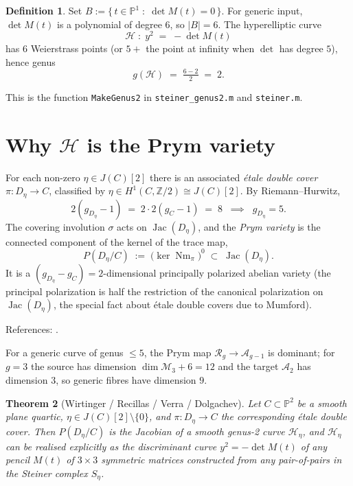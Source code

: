 \documentclass[11pt]{amsart}
\theoremstyle{plain}
\newtheorem{theorem}{Theorem}[section]
\theoremstyle{definition}
\newtheorem{definition}[theorem]{Definition}
\theoremstyle{remark}
\newcommand{\Jac}{\operatorname{Jac}}
\newcommand{\Nm}{\operatorname{Nm}}
\newcommand{\Pp}{\mathbb P}
\newcommand{\Z}{\mathbb Z}
\newcommand{\Hh}{\mathcal H}
\newcommand{\Mm}{\mathcal M}
\newcommand{\Aa}{\mathcal A}
\newcommand{\Rr}{\mathcal R}
\begin{document}
\begin{definition}
Set $B := \bigl\{\, t \in \Pp^1 \;:\; \det M(t) = 0 \,\bigr\}$. For generic
input, $\det M(t)$ is a polynomial of degree $6$, so $|B| = 6$. The
hyperelliptic curve
\[
  \Hh \;:\; y^2 \;=\; -\det M(t)
\]
has $6$ Weierstrass points (or $5 +$ the point at infinity when $\det$ has
degree $5$), hence genus
\[
  g(\Hh) \;=\; \tfrac{6 - 2}{2} \;=\; 2.
\]
\end{definition}

This is the function \texttt{MakeGenus2} in \texttt{steiner\_genus2.m} and
\texttt{steiner.m}.

\section{Why $\Hh$ is the Prym variety}
\label{sec:prym}

For each non-zero $\eta \in J(C)[2]$ there is an associated \emph{\'etale
double cover} $\pi \colon D_\eta \to C$, classified by
$\eta \in H^1(C, \Z/2) \cong J(C)[2]$. By Riemann--Hurwitz,
\[
  2(g_{D_\eta} - 1) \;=\; 2 \cdot 2(g_C - 1) \;=\; 8
  \;\;\implies\;\; g_{D_\eta} = 5.
\]
The covering involution $\sigma$ acts on $\Jac(D_\eta)$, and the
\emph{Prym variety} is the connected component of the kernel of the trace
map,
\[
  P(D_\eta / C) \;:=\; \bigl(\ker \Nm_\pi\bigr)^0 \;\subset\; \Jac(D_\eta).
\]
It is a $(g_{D_\eta} - g_C) = 2$-dimensional principally polarized abelian
variety (the principal polarization is half the restriction of the canonical
polarization on $\Jac(D_\eta)$, the special fact about \'etale double covers
due to Mumford).

References: \cite{Mumford1974,Beauville1977,Donagi1992}.

For a generic curve of genus $\le 5$, the Prym map
$\Rr_g \to \Aa_{g-1}$ is dominant; for $g = 3$ the source has dimension
$\dim \Mm_3 + 6 = 12$ and the target $\Aa_2$ has dimension $3$, so generic
fibres have dimension $9$.

\begin{theorem}[Wirtinger / Recillas / Verra / Dolgachev]
Let $C \subset \Pp^2$ be a smooth plane quartic, $\eta \in J(C)[2] \setminus \{0\}$,
and $\pi \colon D_\eta \to C$ the corresponding \'etale double cover. Then
$P(D_\eta / C)$ is the Jacobian of a smooth genus-2 curve $\Hh_\eta$, and
$\Hh_\eta$ can be realised explicitly as the discriminant curve
$y^2 = -\det M(t)$ of any pencil $M(t)$ of $3 \times 3$ symmetric matrices
constructed from any pair-of-pairs in the Steiner complex $S_\eta$.
\end{theorem}
\end{document}

